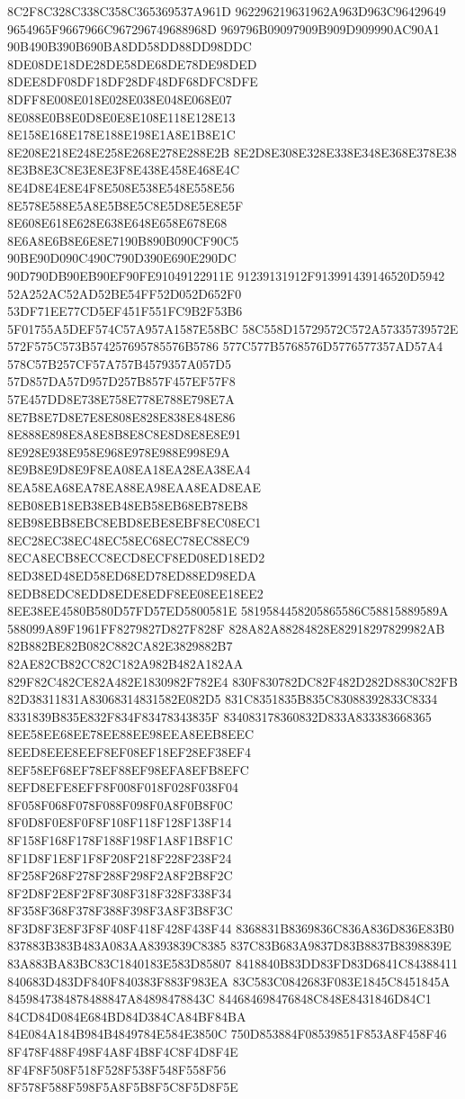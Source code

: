 8C2F8C328C338C358C365369537A961D
962296219631962A963D963C96429649
9654965F9667966C967296749688968D
969796B09097909B909D909990AC90A1
90B490B390B690BA8DD58DD88DD98DDC
8DE08DE18DE28DE58DE68DE78DE98DED
8DEE8DF08DF18DF28DF48DF68DFC8DFE
8DFF8E008E018E028E038E048E068E07
8E088E0B8E0D8E0E8E108E118E128E13
8E158E168E178E188E198E1A8E1B8E1C
8E208E218E248E258E268E278E288E2B
8E2D8E308E328E338E348E368E378E38
8E3B8E3C8E3E8E3F8E438E458E468E4C
8E4D8E4E8E4F8E508E538E548E558E56
8E578E588E5A8E5B8E5C8E5D8E5E8E5F
8E608E618E628E638E648E658E678E68
8E6A8E6B8E6E8E7190B890B090CF90C5
90BE90D090C490C790D390E690E290DC
90D790DB90EB90EF90FE91049122911E
91239131912F913991439146520D5942
52A252AC52AD52BE54FF52D052D652F0
53DF71EE77CD5EF451F551FC9B2F53B6
5F01755A5DEF574C57A957A1587E58BC
58C558D15729572C572A57335739572E
572F575C573B574257695785576B5786
577C577B5768576D5776577357AD57A4
578C57B257CF57A757B4579357A057D5
57D857DA57D957D257B857F457EF57F8
57E457DD8E738E758E778E788E798E7A
8E7B8E7D8E7E8E808E828E838E848E86
8E888E898E8A8E8B8E8C8E8D8E8E8E91
8E928E938E958E968E978E988E998E9A
8E9B8E9D8E9F8EA08EA18EA28EA38EA4
8EA58EA68EA78EA88EA98EAA8EAD8EAE
8EB08EB18EB38EB48EB58EB68EB78EB8
8EB98EBB8EBC8EBD8EBE8EBF8EC08EC1
8EC28EC38EC48EC58EC68EC78EC88EC9
8ECA8ECB8ECC8ECD8ECF8ED08ED18ED2
8ED38ED48ED58ED68ED78ED88ED98EDA
8EDB8EDC8EDD8EDE8EDF8EE08EE18EE2
8EE38EE4580B580D57FD57ED5800581E
5819584458205865586C58815889589A
588099A89F1961FF8279827D827F828F
828A82A88284828E82918297829982AB
82B882BE82B082C882CA82E3829882B7
82AE82CB82CC82C182A982B482A182AA
829F82C482CE82A482E1830982F782E4
830F830782DC82F482D282D8830C82FB
82D38311831A83068314831582E082D5
831C8351835B835C83088392833C8334
8331839B835E832F834F83478343835F
834083178360832D833A833383668365
8EE58EE68EE78EE88EE98EEA8EEB8EEC
8EED8EEE8EEF8EF08EF18EF28EF38EF4
8EF58EF68EF78EF88EF98EFA8EFB8EFC
8EFD8EFE8EFF8F008F018F028F038F04
8F058F068F078F088F098F0A8F0B8F0C
8F0D8F0E8F0F8F108F118F128F138F14
8F158F168F178F188F198F1A8F1B8F1C
8F1D8F1E8F1F8F208F218F228F238F24
8F258F268F278F288F298F2A8F2B8F2C
8F2D8F2E8F2F8F308F318F328F338F34
8F358F368F378F388F398F3A8F3B8F3C
8F3D8F3E8F3F8F408F418F428F438F44
8368831B8369836C836A836D836E83B0
837883B383B483A083AA8393839C8385
837C83B683A9837D83B8837B8398839E
83A883BA83BC83C1840183E583D85807
8418840B83DD83FD83D6841C84388411
840683D483DF840F840383F883F983EA
83C583C0842683F083E1845C8451845A
8459847384878488847A84898478843C
844684698476848C848E8431846D84C1
84CD84D084E684BD84D384CA84BF84BA
84E084A184B984B4849784E584E3850C
750D853884F08539851F853A8F458F46
8F478F488F498F4A8F4B8F4C8F4D8F4E
8F4F8F508F518F528F538F548F558F56
8F578F588F598F5A8F5B8F5C8F5D8F5E
